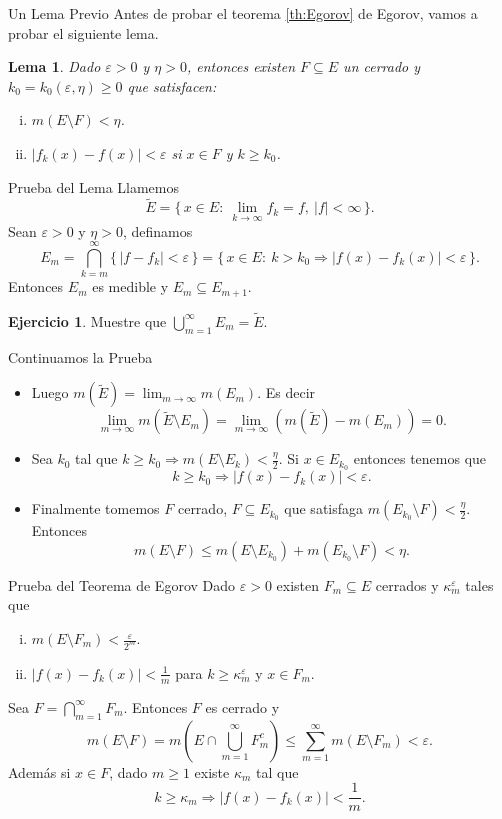 \documentclass[utf8]{beamer}
\theoremstyle{plain}
\newtheorem{Lem}{Lema}                 %
\theoremstyle{definition}
\newtheorem{Ej}{Ejercicio}             %
\theoremstyle{remark}
\numberwithin{equation}{section}
\newcommand{\eps}{\varepsilon}          %
\newcommand{\kp}{\kappa}                %
\newcommand{\set}[1]{\{\,#1\,\}}    %
\renewcommand{\geq}{\geqslant}          %
\renewcommand{\leq}{\leqslant}          %
\newcommand{\less}{\setminus}           %
\newcommand{\To}{\Rightarrow}
\newcommand{\sucm}{_{m=1}^\infty} %
\renewcommand{\.}{\Cdot}                %
\begin{document}
\begin{frame}{Un Lema Previo}
  Antes de probar el teorema \ref{th:Egorov} de Egorov, vamos a probar el siguiente lema.
  \begin{Lem}\label{lem:tecEgorov}
Dado $\eps>0$ y $\eta>0$, entonces existen $F\subseteq E$ un cerrado y $k_0=k_0(\eps,\eta)\geq 0$ que satisfacen:
\begin{enumerate}[(i)]
  \item $m(E\less F)<\eta$.
  \item $|f_k(x)-f(x)|<\eps$ si $x\in F$ y $k\geq k_0$.
\end{enumerate} 
  \end{Lem}
\end{frame}

\begin{frame}{Prueba del Lema}
  Llamemos 
  $$\tilde E=\set{x\in E:\ \lim_{k\to\infty}f_k=f,\ |f|<\infty}.$$
  Sean $\eps>0$ y $\eta>0$, definamos
  $$E_m=\bigcap_{k=m}^\infty\set{|f-f_k|<\eps}=\set{x\in E:\ k>k_0\To |f(x)-f_k(x)|<\eps}.$$
  Entonces $E_m$ es medible y $E_m\subseteq E_{m+1}$. 
  \begin{Ej}\label{ej:pruebaLemEgorov}
Muestre que $\bigcup\sucm E_m=\tilde{E}$.
  \end{Ej}
\end{frame}

\begin{frame}{Continuamos la Prueba}
 \begin{itemize}
   \item Luego $m(\tilde{E})=\lim_{m\to\infty}m(E_m)$. Es decir
   $$\lim_{m\to\infty}m(\tilde{E}\less E_m)=\lim_{m\to\infty}(m(\tilde{E})-m(E_m))=0.$$
  \item Sea $k_0$ tal que $k\geq k_0\To m(E\less E_k)<\frac{\eta}{2}$. Si $x\in E_{k_0}$ entonces tenemos que 
  $$k\geq k_0\To |f(x)-f_k(x)|<\eps.$$
  \item Finalmente tomemos $F$ cerrado, $F\subseteq E_{k_0}$ que satisfaga $m(E_{k_0}\less F)<\frac{\eta}{2}$. Entonces
  $$m(E\less F)\leq m(E\less E_{k_0})+m(E_{k_0}\less F)<\eta.$$
 \end{itemize}
\end{frame}

\begin{frame}{Prueba del Teorema de Egorov}
  Dado $\eps>0$ existen $F_m\subseteq E$ cerrados y $\kp_m^\eps$ tales que 
  \begin{enumerate}[(i)]
    \item $m(E\less F_m)<\frac{\eps}{2^m}$.
    \item $|f(x)-f_k(x)|<\frac1m$ para $k\geq \kp_m^\eps$ y $x\in F_m$.
  \end{enumerate}
  Sea $F=\bigcap\sucm F_m$. Entonces $F$ es cerrado y 
  $$m(E\less F)=m\left(E\cap\bigcup\sucm F_m^c\right)\leq \sum\sucm m(E\less F_m)<\eps.$$
  Además si $x\in F$, dado $m\geq 1$ existe $\kp_m$ tal que
  $$k\geq\kp_m\To|f(x)-f_k(x)|<\frac1m.$$
\end{frame}
\end{document}
